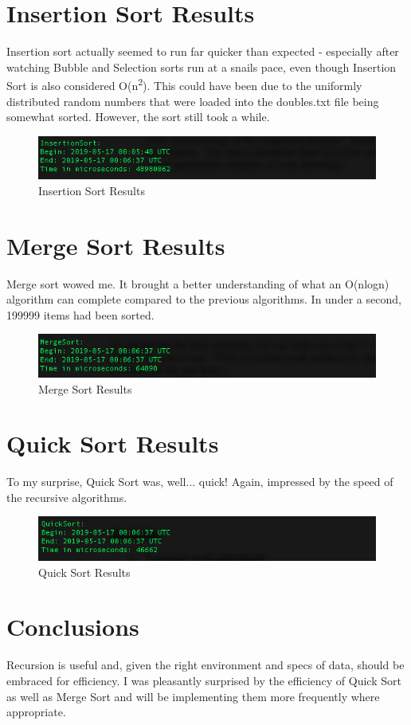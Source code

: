 \section{Insertion Sort Results}\label{isresults}

Insertion sort actually seemed to run far quicker than expected - especially after watching Bubble and Selection sorts run at a snails pace, even though Insertion Sort is also considered O(n\textsuperscript{2}). This could have been due to the uniformly distributed random numbers that were loaded into the doubles.txt file being somewhat sorted. However, the sort still took a while. \newline

\begin{figure}[htbp]
\centering
  \includegraphics[width=.7\linewidth]{is.png}
 \caption{Insertion Sort Results}
\end{figure}


\section{Merge Sort Results}\label{msresults}
Merge sort wowed me. It brought a better understanding of what an O(nlogn) algorithm can complete compared to the previous algorithms. In under a second, 199999 items had been sorted. \begin{figure}[htbp]
\centering
  \includegraphics[width=.7\linewidth]{ms.png}
 \caption{Merge Sort Results}
\end{figure}

\section{Quick Sort Results}\label{qsresults}
To my surprise, Quick Sort was, well... quick! Again, impressed by the speed of the recursive algorithms.
\begin{figure}[htbp]
\centering
  \includegraphics[width=.7\linewidth]{qs.png}
 \caption{Quick Sort Results}
\end{figure}

\section{Conclusions}\label{conclusions}
Recursion is useful and, given the right environment and specs of data, should be embraced for efficiency. I was pleasantly surprised by the efficiency of Quick Sort as well as Merge Sort and will be implementing them more frequently where appropriate.

%


